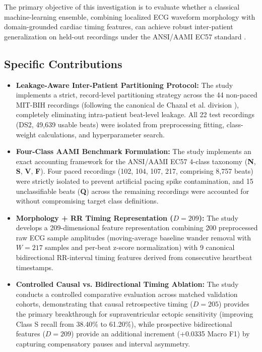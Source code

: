\documentclass[conference]{IEEEtran}
\begin{document}
The primary objective of this investigation is to evaluate whether a classical machine-learning ensemble, combining localized ECG waveform morphology with domain-grounded cardiac timing features, can achieve robust inter-patient generalization on held-out recordings under the ANSI/AAMI EC57 standard \cite{aami1998ec57}.

\subsection{Specific Contributions}
\begin{itemize}
    \item \textbf{Leakage-Aware Inter-Patient Partitioning Protocol:} The study implements a strict, record-level partitioning strategy across the 44 non-paced MIT-BIH recordings (following the canonical de Chazal et al. division \cite{dechazal2004automatic}), completely eliminating intra-patient beat-level leakage. All 22 test recordings (DS2, 49,639 usable beats) were isolated from preprocessing fitting, class-weight calculations, and hyperparameter search.
    \item \textbf{Four-Class AAMI Benchmark Formulation:} The study implements an exact accounting framework for the ANSI/AAMI EC57 4-class taxonomy (\textbf{N}, \textbf{S}, \textbf{V}, \textbf{F}). Four paced recordings (102, 104, 107, 217, comprising 8,757 beats) were strictly isolated to prevent artificial pacing spike contamination, and 15 unclassifiable beats (\textbf{Q}) across the remaining recordings were accounted for without compromising target class definitions.
    \item \textbf{Morphology + RR Timing Representation ($D = 209$):} The study develops a 209-dimensional feature representation combining 200 preprocessed raw ECG sample amplitudes (moving-average baseline wander removal with $W=217$ samples and per-beat z-score normalization) with 9 canonical bidirectional RR-interval timing features derived from consecutive heartbeat timestamps.
    \item \textbf{Controlled Causal vs. Bidirectional Timing Ablation:} The study conducts a controlled comparative evaluation across matched validation cohorts, demonstrating that causal retrospective timing ($D=205$) provides the primary breakthrough for supraventricular ectopic sensitivity (improving Class S recall from 38.40\% to 61.20\%), while prospective bidirectional features ($D=209$) provide an additional increment (+0.0335 Macro F1) by capturing compensatory pauses and interval asymmetry.

\end{itemize}
\end{document}
